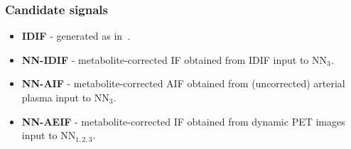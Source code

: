         \subsubsection*{Candidate signals} \label{sec:candidates}
            \begin{itemize}
                \item \textbf{\gls{IDIF}} - generated as in~.
                
                \item \textbf{\gls{NN}-\gls{IDIF}} - metabolite-corrected \gls{IF} obtained from \gls{IDIF} input to \gls{NN}$_3$.
                
                \item \textbf{\gls{NN}-\gls{AIF}} - metabolite-corrected \gls{AIF} obtained from (uncorrected) arterial plasma input to \gls{NN}$_3$.
                
                \item \textbf{\gls{NN}-\gls{AE}\gls{IF}} - metabolite-corrected \gls{IF} obtained from dynamic \gls{PET} images input to \gls{NN}$_{1,2,3}$.
            \end{itemize}
